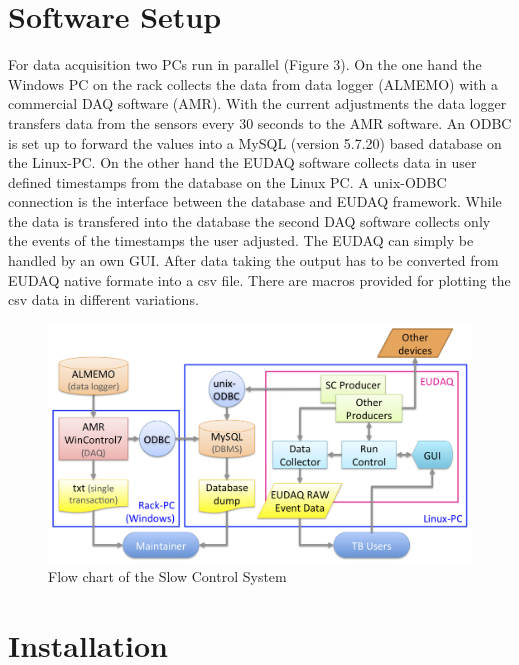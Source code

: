 \documentclass[a4paper,12pt]{scrartcl}
\begin{document}
\section{Software Setup}
For data acquisition two PCs run in parallel (Figure 3). On the one hand the Windows PC on the rack collects the data from data logger (ALMEMO) with a commercial DAQ software (AMR). With the current adjustments the data logger transfers data from the sensors every 30 seconds to the AMR software. An ODBC is set up to forward the values into a MySQL (version 5.7.20) based database on the Linux-PC. On the other hand the EUDAQ software collects data in user defined timestamps from the database on the Linux PC. A unix-ODBC connection is the interface between the database and EUDAQ framework.
While the data is transfered into the database the second DAQ software collects only the events of the timestamps the user adjusted. The EUDAQ can simply be handled by an own GUI.
After data taking the output has to be converted from EUDAQ native formate into a csv file. There are macros provided for plotting the csv data in different variations.

\begin{figure} [H]
\includegraphics[trim={5cm .5cm 2cm 5cm},clip,width=\textwidth]{FlowChartSCS.png}
\caption{Flow chart of the Slow Control System}
\end{figure}

\section{Installation}
\end{document}
